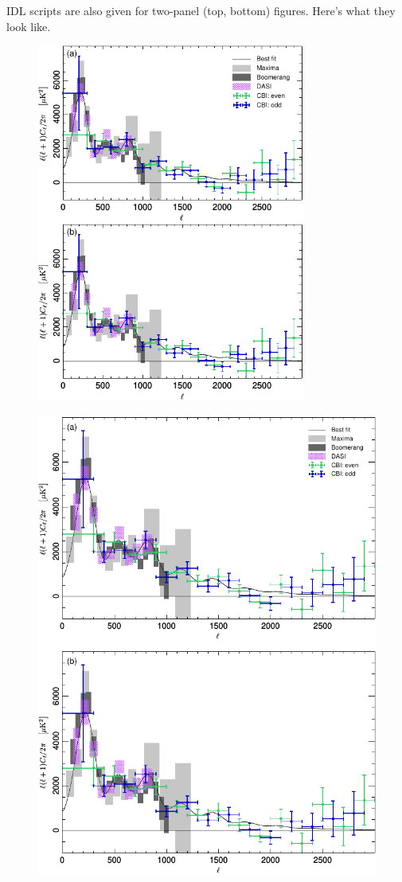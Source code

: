 \documentclass[traditabstract]{aa}
\begin{document}
\clearpage

IDL scripts are also given for two-panel (top, bottom) figures.  Here's what they look like.


\begin{figure}[h]
\includegraphics[width=8.8cm]{PlanckFig_lineplot_IDL_2x88mm.pdf}
\caption{\fcaption} 
\end{figure}

\begin{figure}
\sidecaption
\includegraphics[width=12cm]{PlanckFig_lineplot_IDL_2x120mm.pdf}
\caption{\fcaption}
\end{figure}
\end{document}
